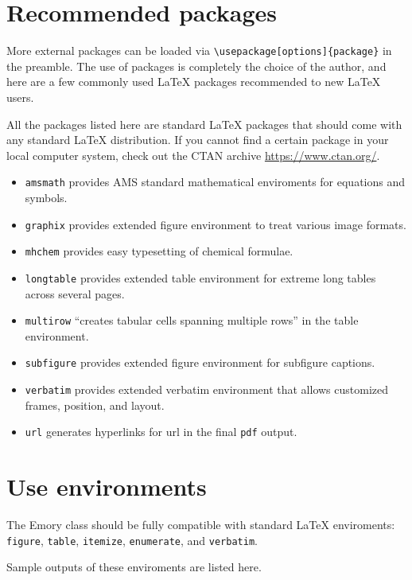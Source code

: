 \documentclass[draft]{emory}
\begin{document}
\section{Recommended packages}
More external packages can be loaded via \verb|\usepackage[options]{package}|
in the preamble. The use of packages is completely the choice of the author,
and here are a few commonly used \LaTeX{} packages recommended to new \LaTeX{}
users.

All the packages listed here are standard \LaTeX{} packages that should come
with any standard \LaTeX{} distribution. If you cannot find a certain package 
in your local computer system, check out the CTAN archive \url{https://www.ctan.org/}.

\begin{itemize}
\item \verb|amsmath| provides AMS standard mathematical enviroments for equations and symbols.
\item \verb|graphix| provides extended figure environment to treat various image formats.
\item \verb|mhchem| provides easy typesetting of chemical formulae.
\item \verb|longtable| provides extended table environment for extreme long tables
across several pages.
\item \verb|multirow| ``creates tabular cells spanning multiple rows'' in the table environment.
\item \verb|subfigure| provides extended figure environment for subfigure captions. 
\item \verb|verbatim| provides extended verbatim environment that allows customized 
frames, position, and layout.
\item \verb|url| generates hyperlinks for url in the final \verb|pdf| output.
\end{itemize}


\section{Use environments}\label{sec:env}
The Emory class should be fully compatible with standard \LaTeX{} enviroments:
\verb|figure|, \verb|table|, \verb|itemize|, \verb|enumerate|, and \verb|verbatim|.

Sample outputs of these enviroments are listed here. 
\end{document}
